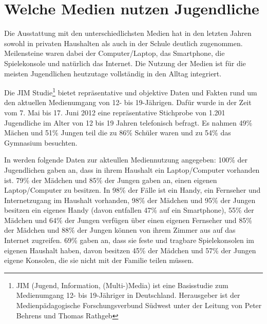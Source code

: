 \section{Welche Medien nutzen Jugendliche}

Die Ausstattung mit den unterschiedlichsten Medien hat in den letzten Jahren sowohl in privaten Haushalten als auch in der Schule deutlich zugenommen. Meilensteine waren dabei der Computer/Laptop, das Smartphone, die Spielekonsole und natürlich das Internet. Die Nutzung der Medien ist für die meisten Jugendlichen heutzutage vollständig in den Alltag integriert. 

Die JIM Studie\footnote{JIM (Jugend, Information, (Multi-)Media) ist eine Basisstudie zum Medienumgang 12- bis 19-Jähriger in Deutschland. Herausgeber ist der Medienpädagogische Forschungsverbund Südwest unter der Leitung von Peter Behrens und Thomas Rathgeb} bietet repräsentative und objektive Daten und Fakten rund um den aktuellen Medienumgang von 12- bis 19-Jährigen. Dafür wurde in der Zeit vom 7. Mai bis 17. Juni 2012 eine repräsentative Stichprobe von 1.201 Jugendliche im Alter von 12 bis 19 Jahren telefonisch befragt. Es nahmen 49\% Mächen und 51\% Jungen teil die zu 86\% Schüler waren und zu 54\% das Gymnasium besuchten. 

In \citet{jim12} werden folgende Daten zur akteullen Mediennutzung angegeben: 100\% der Jugendlichen gaben an, dass in ihrem Haushalt ein Laptop/Computer vorhanden ist. 79\% der Mädchen und 85\% der Jungen gaben an, einen eigenen Laptop/Computer zu besitzen. In 98\% der Fälle ist ein Handy, ein Fernseher und Internetzugang im Haushalt vorhanden, 98\% der Mädchen und 95\% der Jungen besitzen ein eigenes Handy (davon entfallen 47\% auf ein Smartphone), 55\% der Mädchen und 64\% der Jungen verfügen über einen eigenen Fernseher und 85\% der Mädchen und 88\% der Jungen können von ihrem Zimmer aus auf das Internet zugreifen. 69\% gaben an, dass sie feste und tragbare Spielekonsolen im eigenen Haushalt haben, davon besitzen 45\% der Mädchen und 57\% der Jungen eigene Konsolen, die sie nicht mit der Familie teilen müssen. 